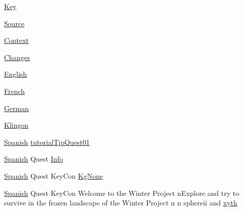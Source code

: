 \begin{DoxyCompactItemize}
\item 
\mbox{\hyperlink{_sphere_i_i_01_winter_01_project_2_config_2_localization_01-_01_quest_8txt_ab3c7af4820830f9166ede9e5623c4e73}{Key}}
\item 
\mbox{\hyperlink{_sphere_i_i_01_winter_01_project_2_config_2_localization_01-_01_quest_8txt_a176e1eca2d1e3d1c6a064340bc6a351e}{Source}}
\item 
\mbox{\hyperlink{_sphere_i_i_01_winter_01_project_2_config_2_localization_01-_01_quest_8txt_abbebfae2c8b3c06e3115e79965277840}{Context}}
\item 
\mbox{\hyperlink{_sphere_i_i_01_winter_01_project_2_config_2_localization_01-_01_quest_8txt_aada75e543d2eadaa69533d17cac8bd9a}{Changes}}
\item 
\mbox{\hyperlink{_sphere_i_i_01_winter_01_project_2_config_2_localization_01-_01_quest_8txt_ad896b63205779b1b09e86d941ce13976}{English}}
\item 
\mbox{\hyperlink{_sphere_i_i_01_winter_01_project_2_config_2_localization_01-_01_quest_8txt_addddcf918bce70f82d5d59902a7e3fba}{French}}
\item 
\mbox{\hyperlink{_sphere_i_i_01_winter_01_project_2_config_2_localization_01-_01_quest_8txt_a18bff3d9892c435006ca22f43a9f031f}{German}}
\item 
\mbox{\hyperlink{_sphere_i_i_01_winter_01_project_2_config_2_localization_01-_01_quest_8txt_ae413412a6184b4aa46db8a189cad08d9}{Klingon}}
\item 
\mbox{\hyperlink{_sphere_i_i_01_winter_01_project_2_config_2_localization_8txt_a1a2fba2f516cad50ef94b146902a8336}{Spanish}} \mbox{\hyperlink{_sphere_i_i_01_winter_01_project_2_config_2_localization_01-_01_quest_8txt_a8ef521616f181ae4be45cc78eb204b15}{tutorial\+Tip\+Quest01}}
\item 
\mbox{\hyperlink{_sphere_i_i_01_winter_01_project_2_config_2_localization_8txt_a1a2fba2f516cad50ef94b146902a8336}{Spanish}} Quest \mbox{\hyperlink{_sphere_i_i_01_winter_01_project_2_config_2_localization_01-_01_quest_8txt_a487dbfac8e358fd1d3bb8df1ba0b5ff3}{Info}}
\item 
\mbox{\hyperlink{_sphere_i_i_01_winter_01_project_2_config_2_localization_8txt_a1a2fba2f516cad50ef94b146902a8336}{Spanish}} Quest Key\+Con \mbox{\hyperlink{_sphere_i_i_01_winter_01_project_2_config_2_localization_01-_01_quest_8txt_a43083f709a16362057624a9dd36c5f91}{Kg\+None}}
\item 
\mbox{\hyperlink{_sphere_i_i_01_winter_01_project_2_config_2_localization_8txt_a1a2fba2f516cad50ef94b146902a8336}{Spanish}} Quest Key\+Con Welcome to the Winter Project n\+Explore and try to survive in the frozen landscape of the Winter Project n n sphereii and \mbox{\hyperlink{_sphere_i_i_01_winter_01_project_2_config_2_localization_01-_01_quest_8txt_a644486df9bf1fa5afa182c0364ad184a}{xyth}}
\end{DoxyCompactItemize}


